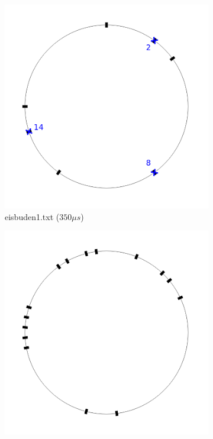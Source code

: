 \documentclass[a4paper,10pt,ngerman,captions=figureheading]{scrartcl}
\newcommand{\imageWidth}{0.3\linewidth}
\begin{document}
\begin{figure}[h!t]
    \centering
    \caption{Stabile Arrangements mit den niedrigsten Eisdielendistanzen der Beispieldateien}
    \label{fig:BWINF_Beispiele}
    \begin{subfigure}[t]{\imageWidth}
        \includegraphics[width=\linewidth]{eisbuden1.png}
        \caption{eisbuden1.txt ($350\mu s$)}
        \label{fig:eisbuden1}
    \end{subfigure}
    \begin{subfigure}[t]{\imageWidth}
        \includegraphics[width=\linewidth]{eisbuden2.png}

\end{subfigure}
\end{figure}
\end{document}
